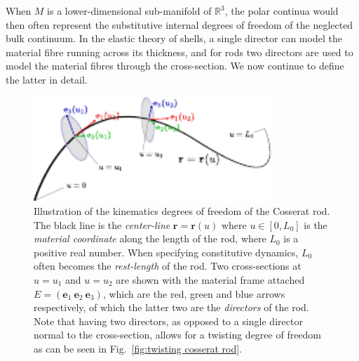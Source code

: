 When $M$ is a lower-dimensional sub-manifold of $\mathbb{R}^3$, the polar continua would then often represent the substitutive internal degrees of freedom of the neglected bulk continuum. In the elastic theory of shells, a single director can model the material fibre running across its thickness, and for rods two directors are used to model the material fibres through the cross-section. We now continue to define the latter in detail.

\begin{figure}[t]
\centering
        \includegraphics[width=0.8\textwidth]{figs_part2/cosserat_kinematics/cosserat_cross_section.pdf}
        \caption{Illustration of the kinematics degrees of freedom of the Cosserat rod. The black line is the \textit{center-line} $\mathbf{r}=\mathbf{r}(u)$ where $u \in [0,L_0]$ is the \textit{material coordinate} along the length of the rod, where $L_0$ is a positive real number. When specifying constitutive dynamics, $L_0$ often becomes the \textit{rest-length} of the rod. Two cross-sections at $u=u_1$ and $u=u_2$ are shown with the material frame attached $E = (\mathbf{e}_1\ \mathbf{e}_2\ \mathbf{e}_3)$, which are the red, green and blue arrows respectively, of which the latter two are the \textit{directors} of the rod. Note that having two directors, as opposed to a single director normal to the cross-section, allows for a twisting degree of freedom as can be seen in Fig.~\ref{fig:twisting cosserat rod}.}
        \label{fig:Cosserat kinematic degrees of freedom}
\end{figure}

